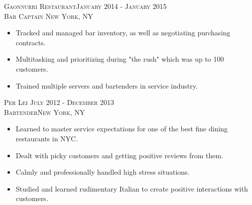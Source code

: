 \documentclass[oneside, final]{scrartcl}
\begin{document}
\begin{center}
\textsc{Gaonnurri Restaurant\hfill January 2014 - January 2015\\}
\textsc{Bar Captain \hfill New York, NY\\}
\begin{itemize}
	\setlength{\itemsep}{1pt}
	\setlength{\parskip}{0pt}
	\setlength{\parsep}{0pt}
	\setlength{\leftmargin}{-5mm}
	\item Tracked and managed bar inventory, as well as negotiating purchasing contracts.
    \item Multitasking and prioritizing during "the rush" which was up to 100 customers.
    \item Trained multiple servers and bartenders in service industry.
\end{itemize}

\textsc{Per Lei \hfill July 2012 - December 2013\\}
\textsc{Bartender\hfill New York, NY\\}
\begin{itemize}
	\setlength{\itemsep}{1pt}
	\setlength{\parskip}{0pt}
	\setlength{\parsep}{0pt}
	\setlength{\leftmargin}{-5mm}
    \item Learned to master service expectations for one of the best fine dining restaurants in NYC.
    \item Dealt with picky customers and getting positive reviews from them.
    \item Calmly and professionally handled high stress situations.
	\item Studied and learned rudimentary Italian to create positive interactions with customers.
\end{itemize}


\end{center}
\end{document}
